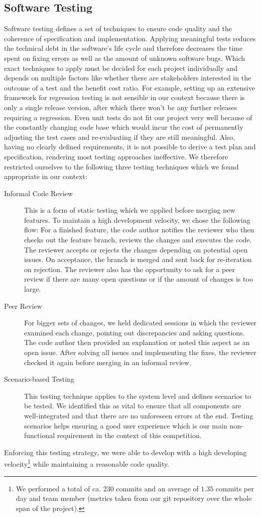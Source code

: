\subsection{Software Testing}\label{subsec:sw_testing}
Software testing defines a set of techniques to ensure code quality and the coherence of specification and implementation.
Applying meaningful tests reduces the technical debt in the software's life cycle and therefore decreases the time spent on fixing errors as well as the amount of unknown software bugs.
Which exact techniques to apply must be decided for each project individually and depends on multiple factors like whether there are stakeholders interested in the outcome of a test and the benefit cost ratio.
For example, setting up an extensive framework for regression testing is not sensible in our context because there is only a single release version, after which there won't be any further releases requiring a regression.
Even unit tests do not fit our project very well because of the constantly changing code base which would incur the cost of permanently adjusting the test cases and re-evaluating if they are still meaningful.
Also, having no clearly defined requirements, it is not possible to derive a test plan and specification, rendering most testing approaches ineffective.
We therefore restricted ourselves to the following three testing techniques which we found appropriate in our context:
\begin{description}
	\item[Informal Code Review] This is a form of static testing which we applied before merging new features. To maintain a high development velocity, we chose the following flow: For a finished feature, the code author notifies the reviewer who then checks out the feature branch, reviews the changes and executes the code. The reviewer accepts or rejects the changes depending on potential open issues. On acceptance, the branch is merged and sent back for re-iteration on rejection. The reviewer also has the opportunity to ask for a peer review if there are many open questions or if the amount of changes is too large.
	\item[Peer Review] For bigger sets of changes, we held dedicated sessions in which the reviewer examined each change, pointing out discrepancies and asking questions. The code author then provided an explanation or noted this aspect as an open issue. After solving all issues and implementing the fixes, the reviewer checked it again before merging in an informal review.
	\item[Scenario-based Testing] This testing technique applies to the system level and defines scenarios to be tested. We identified this as vital to ensure that all components are well-integrated and that there are no unforeseen errors at the end. Testing scenarios helps ensuring a good user experience which is our main non-functional requirement in the context of this competition. 
\end{description}
Enforcing this testing strategy, we were able to develop with a high developing velocity\footnote{We performed a total of ca. 230 commits and an average of $1.35$ commits per day and team member (metrics taken from our git repository over the whole span of the project).} while maintaining a reasonable code quality.
